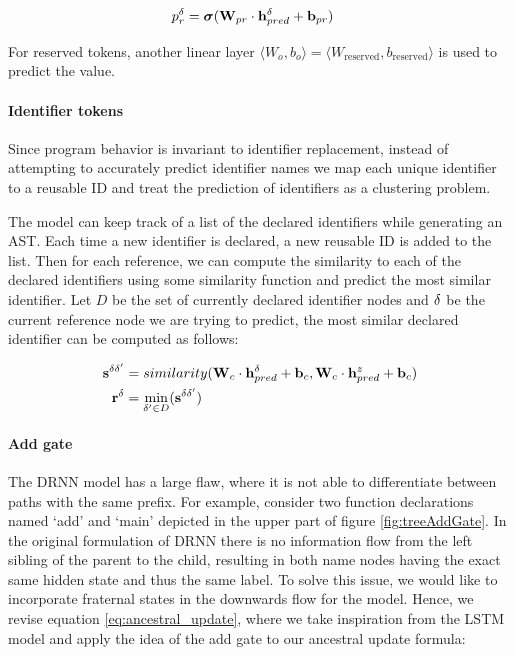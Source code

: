 \begin{align}
    p_r^\delta &= \boldsymbol\sigma(\mathbf{W}_{pr} \cdot \mathbf{h}_{pred}^\delta + \mathbf{b}_{pr}) \label{eq:res_pred}
\end{align}

For reserved tokens, another linear layer $\langle W_o,b_o \rangle = \langle W_\text{reserved},b_\text{reserved} \rangle$ is used to predict the value.

\paragraph{Identifier tokens}
Since program behavior is invariant to identifier replacement, instead of attempting to accurately predict identifier names we map each unique identifier to a reusable ID \cite{tufano2019learning} and treat the prediction of identifiers as a clustering problem. 

The model can keep track of a list of the declared identifiers while generating an AST. Each time a new identifier is declared, a new reusable ID is added to the list. Then for each reference, we can compute the similarity to each of the declared identifiers using some similarity function and predict the most similar identifier. Let $D$ be the set of currently declared identifier nodes and $\delta$ be the current reference node we are trying to predict, the most similar declared identifier can be computed as follows:

\begin{align}
    \mathbf{s}^{\delta \delta'} &= similarity(\mathbf{W}_c \cdot \mathbf{h}^\delta_{pred} + \mathbf{b}_c,  \mathbf{W}_c \cdot \mathbf{h}^z_{pred} + \mathbf{b}_c) \\
    \mathbf{r}^\delta &= \min_{\delta' \in D}(\mathbf{s}^{\delta \delta'})
\end{align}

\paragraph{Add gate} \label{par:addgate} The DRNN model has a large flaw, where it is not able to differentiate between paths with the same prefix. For example, consider two function declarations named `add' and `main' depicted in the upper part of figure \ref{fig:treeAddGate}. In the original formulation of DRNN \cite{alvarezmelis2017tree} there is no information flow from the left sibling of the parent to the child, resulting in both name nodes having the exact same hidden state and thus the same label. To solve this issue, we would like to incorporate fraternal states in the downwards flow for the model. Hence, we revise equation \ref{eq:ancestral_update}, where we take inspiration from the LSTM model and apply the idea of the add gate to our ancestral update formula:

